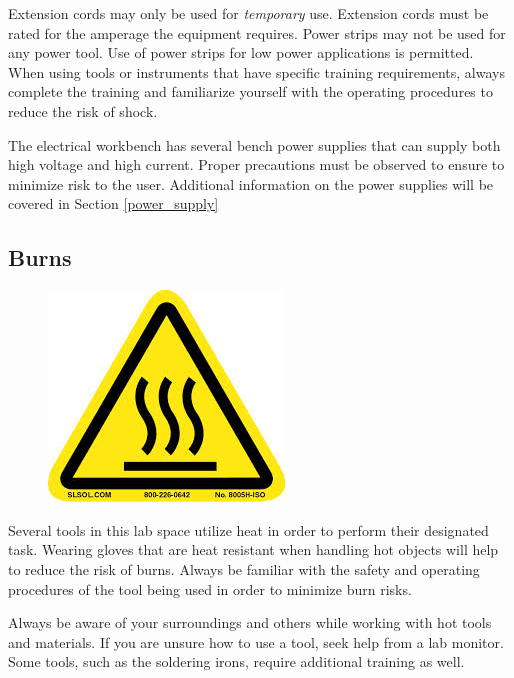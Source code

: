 Extension cords may only be used for \emph{temporary} use.  Extension cords must be rated for the amperage the equipment requires.  Power strips may not be used for any power tool.  Use of power strips for low power applications is permitted.  When using tools or instruments that have specific training requirements, always complete the training and familiarize yourself with the operating procedures to reduce the risk of shock.

The electrical workbench has several bench power supplies that can supply both high voltage and high current.  Proper precautions must be observed to ensure to minimize risk to the user.  Additional information on the power supplies will be covered in Section \ref{power_supply}

\subsection{Burns}
\begin{framed}
\begin{figure}
\includegraphics[width=\linewidth]{images/burn_hazard.jpg}
\end{figure}
Several tools in this lab space utilize heat in order to perform their designated task. Wearing gloves that are heat resistant when handling hot objects will help to reduce the risk of burns. Always be familiar with the safety and operating procedures of the tool being used in order to minimize burn risks. 
\end{framed}
Always be aware of your surroundings and others while working with hot tools and materials. If you are unsure how to use a tool, seek help from a lab monitor.  Some tools, such as the soldering irons, require additional training as well.

